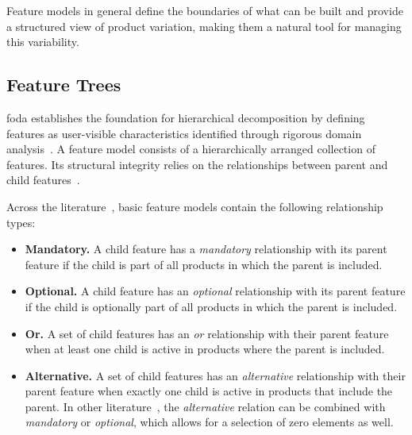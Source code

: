 Feature models in general define the boundaries of what can be built and provide a structured view of product variation, making them a natural tool for managing this variability.

\subsection{Feature Trees}
\label{subsec:bg_feature_modeling_feature_trees}

\gls{foda} establishes the foundation for hierarchical decomposition by defining features as user-visible characteristics identified through rigorous domain analysis~\cite{kang_feature-oriented_1990}.
A feature model consists of a hierarchically arranged collection of features.
Its structural integrity relies on the relationships between parent and child features~\cite{kang_feature-oriented_1990, czarnecki_formalizing_2005}.

Across the literature~\cite{lee_concepts_2002, czarnecki_formalizing_2005, czarnecki_staged_2004, benavides_automated_2005, benavides_automated_2010}, basic feature models contain the following relationship types:

\begin{itemize}
    \item \textbf{Mandatory.}
    A child feature has a \textit{mandatory} relationship with its parent feature if the child is part of all products in which the parent is included.
    \item \textbf{Optional.}
    A child feature has an \textit{optional} relationship with its parent feature if the child is optionally part of all products in which the parent is included.
    \item \textbf{Or.}
    A set of child features has an \textit{or} relationship with their parent feature when at least one child is active in products where the parent is included.
    \item \textbf{Alternative.}
    A set of child features has an \textit{alternative} relationship with their parent feature when exactly one child is active in products that include the parent.
    In other literature~\cite{lee_concepts_2002, benavides_automated_2005}, the \textit{alternative} relation can be combined with \textit{mandatory} or \textit{optional}, which allows for a selection of zero elements as well.
\end{itemize}

